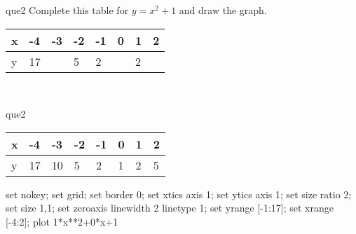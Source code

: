\documentclass[13.5pt, varwidth=true]{beamer}
\begin{document}
\begin{frame}[shrink=19,fragile]
	\begin{beamercolorbox}[rounded=true, left, shadow=true,wd=14.8cm]{que2}
		 Complete this table for $y = x^{2} + 1$ and draw the graph. \\[0.3cm] \renewcommand{\arraystretch}{1.2}\begin{tabular}{|C|C|C|C|C|C|C|C|} \hline x & -4 & -3 & -2 & -1 & 0 & 1 & 2 \\ \hline y & 17 &  & 5 & 2 &  & 2 & \\ \hline \end{tabular}\\[0.3cm]
	\end{beamercolorbox}
\end{frame}
\begin{frame}[shrink=19,fragile]
	\begin{beamercolorbox}[rounded=true, left, shadow=true,wd=14.8cm]{que2}
		\renewcommand{\arraystretch}{1.2}\begin{tabular}{|C|C|C|C|C|C|C|C|} \hline x & -4 & -3 & -2 & -1 & 0 & 1 & 2 \\ \hline y & 17 & 10 & 5 & 2 & 1 & 2 & 5\\ \hline \end{tabular}\begin{gnuplot}[terminal=pdf] set nokey; set grid; set border 0; set xtics axis 1; set ytics axis 1; set size ratio 2; set size 1,1; set zeroaxis linewidth 2 linetype 1; set yrange [-1:17]; set xrange [-4:2]; plot 1*x**2+0*x+1 \end{gnuplot}
	\end{beamercolorbox}
\end{frame}
\end{document}
